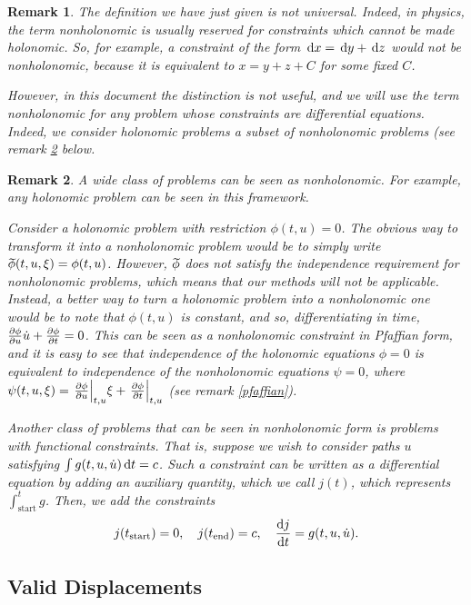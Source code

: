 \documentclass{article}
\theoremstyle{plain}
\newtheorem{remark}{Remark}
\theoremstyle{nonumberplain}
\newcommand{\tstart}{\mathrm{start}}
\newcommand{\tend}{\mathrm{end}}
\newcommand{\wtphi}{
  \mspace{2mu}
  \widetilde{\mspace{-2mu}\smash[t]{\phi}}
}
\DeclarePairedDelimiter\eval{.}{\rvert}
\begin{document}
\begin{remark}
The definition we have just given is not universal. Indeed, in physics, the term nonholonomic is usually reserved for constraints which \emph{cannot} be made holonomic. So, for example, a constraint of the form $\dl x = \dl y + \dl z$ would not be nonholonomic, because it is equivalent to $x = y + z + C$ for some fixed $C$.

However, in this document the distinction is not useful, and we will use the term nonholonomic for any problem whose constraints are differential equations. Indeed, we consider holonomic problems a subset of nonholonomic problems (see remark \ref{nonholoaregeneral} below.
\end{remark}

\begin{remark}\label{nonholoaregeneral}
A wide class of problems can be seen as nonholonomic. For example, any holonomic problem can be seen in this framework.

Consider a holonomic problem with restriction $\phi(t,u) = 0$. The obvious way to transform it into a nonholonomic problem would be to simply write $\wtphi(t,u,\xi) = \phi(t,u)$. However, $\wtphi$ does not satisfy the independence requirement for nonholonomic problems, which means that our methods will not be applicable. Instead, a better way to turn a holonomic problem into a nonholonomic one would be to note that $\phi(t,u)$ is constant, and so, differentiating in time, $\diffp \phi u \dot u + \diffp \phi t = 0$. This can be seen as a nonholonomic constraint in Pfaffian form, and it is easy to see that independence of the holonomic equations $\phi = 0$ is equivalent to independence of the nonholonomic equations $\psi = 0$, where $\psi(t,u,\xi) = \eval*{\diffp \phi u}_{t,u} \xi + \eval*{\diffp \phi t}_{t,u}$ (see remark \ref{pfaffian}).

Another class of problems that can be seen in nonholonomic form is problems with functional constraints. That is, suppose we wish to consider paths $u$ satisfying $\int g(t,u,\dot u) \dl t = c$. Such a constraint can be written as a differential equation by adding an auxiliary quantity, which we call $j(t)$, which represents $\int_\tstart^t g$. Then, we add the constraints
\[j(t_\tstart) = 0, \quad j(t_\tend) = c, \quad \diff j t = g(t,u,\dot u).\]
\end{remark}



\subsection{Valid Displacements}
\end{document}
